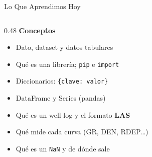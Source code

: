 \documentclass[aspectratio=169, 11pt]{beamer}
\begin{document}
\begin{frame}{Lo Que Aprendimos Hoy}
  \vspace{-6pt}
  \begin{columns}[T]
    \begin{column}{0.48\textwidth}
      {\footnotesize\color{arcaDark}\bfseries Conceptos}
      \vspace{3pt}
      {\footnotesize\color{textMuted}
      \begin{itemize}\setlength{\itemsep}{2pt}
        \item[{\color{codeGreen}\scriptsize\faCheck}]
          Dato, dataset y datos tabulares
        \item[{\color{codeGreen}\scriptsize\faCheck}]
          Qué es una librería; \texttt{pip} e \texttt{import}
        \item[{\color{codeGreen}\scriptsize\faCheck}]
          Diccionarios: \texttt{\{clave: valor\}}
        \item[{\color{codeGreen}\scriptsize\faCheck}]
          DataFrame y Series (pandas)
        \item[{\color{codeGreen}\scriptsize\faCheck}]
          Qué es un well log y el formato \textbf{LAS}
        \item[{\color{codeGreen}\scriptsize\faCheck}]
          Qué mide cada curva (GR, DEN, RDEP\ldots)
        \item[{\color{codeGreen}\scriptsize\faCheck}]
          Qué es un \texttt{NaN} y de dónde sale
      \end{itemize}
      }
    \end{column}


\end{columns}
\end{frame}
\end{document}
